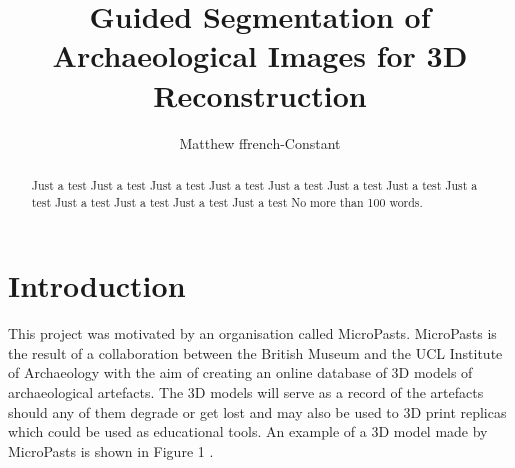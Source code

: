 \documentclass[12pt]{IIBproject}
\begin{document}
\author{Matthew ffrench-Constant}
\title{Guided Segmentation of Archaeological Images for
3D Reconstruction}
\maketitle
\thispagestyle{empty}



\begin{abstract}
Just a test Just a test Just a test Just a test Just a test Just a test 
Just a test Just a test Just a test Just a test Just a test Just a test 
No more than 100 words.
\end{abstract}
\pagestyle{plain}
\tableofcontents
\newpage














\section{Introduction}

This project was motivated by an organisation called MicroPasts\cite{micropasts}. MicroPasts is the result of a collaboration between the British Museum and the UCL Institute of Archaeology with the aim of creating an online database of 3D models of archaeological artefacts. The 3D models will serve as a record of the artefacts should any of them degrade or get lost and may also be used to 3D print replicas which could be used as educational tools. An example of a 3D model made by MicroPasts is shown in Figure 1 \cite{jugModel}.
\end{document}
